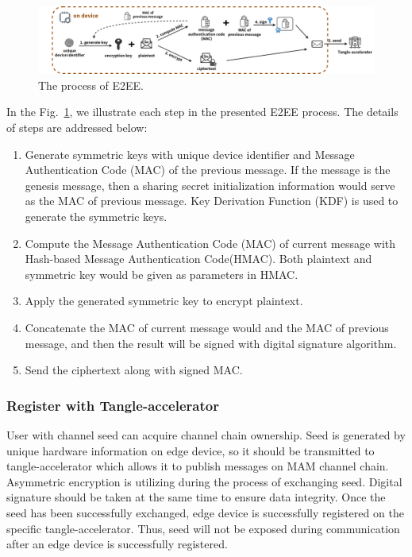 \documentclass[conference]{IEEEtran}
\begin{document}
\begin{figure}[!t]
    \centering
    \includegraphics[width=\linewidth]{MAM_E2EE}
    \caption{The process of E2EE.}
    \label{fig:MAM_E2EE}
\end{figure}

In the Fig.~\ref{fig:MAM_E2EE}, we illustrate each step in the presented E2EE process. The details of steps are addressed below:

\begin{enumerate}
    \item Generate symmetric keys with unique device identifier and Message Authentication Code (MAC) of the previous message. If the message is the genesis message, then a sharing secret initialization information would serve as the MAC of previous message. Key Derivation Function (KDF) is used to generate the symmetric keys.
    \item Compute the Message Authentication Code (MAC) of current message with Hash-based Message Authentication Code(HMAC). Both plaintext and symmetric key would be given as parameters in HMAC.
    \item Apply the generated symmetric key to encrypt plaintext.
    \item Concatenate the MAC of current message would and the MAC of previous message, and then the result will be signed with digital signature algorithm.
    \item Send the ciphertext along with signed MAC.
\end{enumerate}

\subsubsection{Register with Tangle-accelerator}
User with channel seed can acquire channel chain ownership. Seed is generated by unique hardware information on edge device, so it should be transmitted to tangle-accelerator which allows it to publish messages on MAM channel chain. Asymmetric encryption is utilizing during the process of exchanging seed. Digital signature should be taken at the same time to ensure data integrity. Once the seed has been successfully exchanged, edge device is successfully registered on the specific tangle-accelerator. Thus, seed will not be exposed during communication after an edge device is successfully registered.
\end{document}
